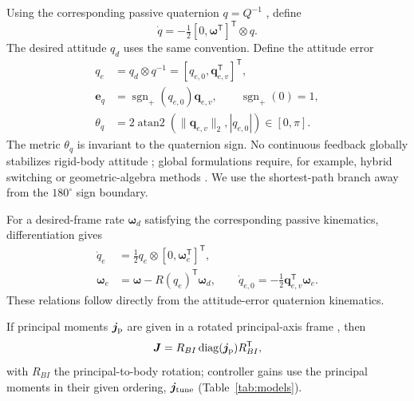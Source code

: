 \documentclass[letterpaper, 10 pt, conference]{ieeeconf}
\newcommand{\T}{^{\mathsf T}}
\newcommand{\sgnp}{\operatorname{sgn}_{+}}
\begin{document}
Using the corresponding passive quaternion $q=Q^{-1}$ \cite{diebel2006quaternion}, define
\begin{equation}
 \dot q=-\tfrac12[0,\bm\omega\T]\T\otimes q.
 \label{eq:passive}
\end{equation}
The desired attitude $q_d$ uses the same convention. Define the attitude error
\begin{align}
 q_e&=q_d\otimes q^{-1}=[q_{e,0},\bm q_{e,v}\T]\T,\\
 \bm e_q&=\sgnp(q_{e,0})\bm q_{e,v},\qquad \sgnp(0)=1,\\
 \theta_q&=2\operatorname{atan2}(\|\bm q_{e,v}\|_2,|q_{e,0}|)
             \in[0,\pi].
 \label{eq:theta}
\end{align}
The metric $\theta_q$ is invariant to the quaternion sign. No continuous feedback globally stabilizes rigid-body attitude \cite{chaturvedi2011rigid}; global formulations require, for example, hybrid switching \cite{mayhew2011hybrid} or geometric-algebra methods \cite{rubioscola2026ga}. We use the shortest-path branch away from the $180^\circ$ sign boundary.

For a desired-frame rate $\bm\omega_d$ satisfying the corresponding passive kinematics, differentiation gives
\begin{align}
 \dot q_e&=\tfrac12q_e\otimes[0,\bm\omega_e\T]\T,\\
 \bm\omega_e&=\bm\omega-R(q_e)\T\bm\omega_d,\qquad
 \dot q_{e,0}=-\tfrac12\bm q_{e,v}\T\bm\omega_e.
 \label{eq:errkin}
\end{align}
These relations follow directly from the attitude-error quaternion kinematics. 

If principal moments $\bm j_{\rm p}$ are given in a rotated principal-axis frame \cite{schaub2018amss}, then
\begin{equation}
 \bm J=R_{BI}\operatorname{diag}(\bm j_{\rm p})R_{BI}\T,
 \label{eq:inertiaframe}
\end{equation}
with $R_{BI}$ the principal-to-body rotation; controller gains use the principal moments in their given ordering, $\bm j_{\rm tune}$ (Table~\ref{tab:models}).
\end{document}
